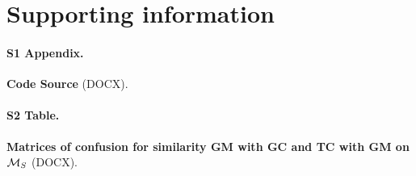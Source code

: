 \documentclass[10pt,letterpaper]{article}
\begin{document}
\section*{Supporting information}

\paragraph*{S1 Appendix.}
\label{S1_appendix}

{\bf Code Source} (DOCX).

\paragraph*{S2 Table.}
\label{S2_table}

{\bf Matrices of confusion for similarity GM with GC and TC with GM on ${\cal M}_S$ } (DOCX).

%
%
%
%
%
%
%

\nolinenumbers
\end{document}
